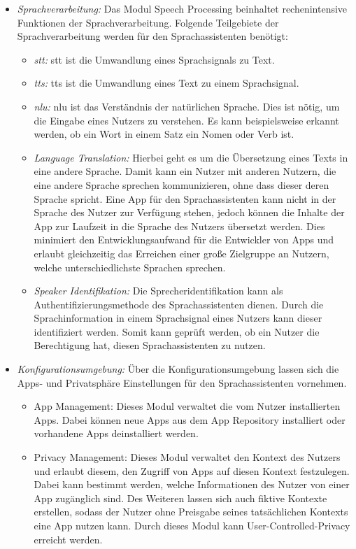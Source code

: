 \begin{itemize}
	\item \textsl{Sprachverarbeitung:} Das Modul Speech Processing beinhaltet rechenintensive Funktionen der Sprachverarbeitung. Folgende Teilgebiete der Sprachverarbeitung werden für den Sprachassistenten benötigt:
	\begin{itemize}
		\item \textsl{\ac{stt}:} \ac{stt} ist die Umwandlung eines Sprachsignals zu Text.
		\item \textsl{\ac{tts}:} \ac{tts} ist die Umwandlung eines Text zu einem Sprachsignal.
		\item \textsl{\ac{nlu}:} \ac{nlu} ist das Verständnis der natürlichen Sprache. Dies ist nötig, um die Eingabe eines Nutzers zu verstehen. Es kann beispielsweise erkannt werden, ob ein Wort in einem Satz ein Nomen oder Verb ist. 
		\item \textsl{Language Translation:} Hierbei geht es um die Übersetzung eines Texts in eine andere Sprache. Damit kann ein Nutzer mit anderen Nutzern, die eine andere Sprache sprechen kommunizieren, ohne dass dieser deren Sprache spricht. Eine App für den Sprachassistenten kann nicht in der Sprache des Nutzer zur Verfügung stehen, jedoch können die Inhalte der App zur Laufzeit in die Sprache des Nutzers übersetzt werden. Dies minimiert den Entwicklungsaufwand für die Entwickler von Apps und erlaubt gleichzeitig das Erreichen einer große Zielgruppe an Nutzern, welche unterschiedlichste Sprachen sprechen. 
		\item \textsl{Speaker Identifikation:} Die Sprecheridentifikation kann als Authentifizierungsmethode des Sprachassistenten dienen. Durch die Sprachinformation in einem Sprachsignal eines Nutzers kann dieser identifiziert werden. Somit kann geprüft werden, ob ein Nutzer die Berechtigung hat, diesen Sprachassistenten zu nutzen.
	\end{itemize}
	\item \textsl{Konfigurationsumgebung:} Über die Konfigurationsumgebung lassen sich die Apps- und Privatsphäre Einstellungen für den Sprachassistenten vornehmen.
	\begin{itemize}
		\item App Management: Dieses Modul verwaltet die vom Nutzer installierten Apps. Dabei können neue Apps aus dem App Repository installiert oder vorhandene Apps deinstalliert werden.
		\item Privacy Management: Dieses Modul verwaltet den Kontext des Nutzers und erlaubt diesem, den Zugriff von Apps auf diesen Kontext festzulegen. Dabei kann bestimmt werden, welche Informationen des Nutzer von einer App zugänglich sind. Des Weiteren lassen sich auch fiktive Kontexte erstellen, sodass der Nutzer ohne Preisgabe seines tatsächlichen Kontexts eine App nutzen kann. Durch dieses Modul kann User-Controlled-Privacy erreicht werden. 
	\end{itemize}	
\end{itemize}





